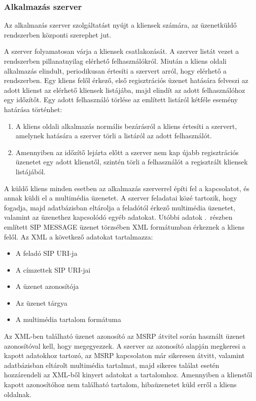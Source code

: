 \subsubsection{Alkalmazás szerver}
\label{sec:appserver}

Az alkalmazás szerver szolgáltatást nyújt a kliensek számára, az üzenetküldő rendszerben központi szerephet jut.

A szerver folyamatosan várja a kliensek csatlakozását. A szerver listát vezet a rendszerben pillanatnyilag elérhető felhasználókról. Miután a kliens oldali alkalmazás elindult, periodikusan értesíti a szervert arról, hogy elérhető a rendszerben. Egy kliens felől érkező, első regisztrációs üzenet hatására felveszi az adott klienst az elérhető kliensek listájába, majd elindít az adott felhasználóhoz egy időzítőt. Egy adott felhasználó törlése az említett listáról kétféle esemény határása történhet:
\begin{enumerate}\itemsep1pt
\item	A kliens oldali alkalmazás normális bezárásról a kliens értesíti a szervert, a\-mely\-nek hatására a szerver törli a listáról az adott felhasználót.
\item Amennyiben az időzítő lejárta előtt a szerver nem kap újabb regisztrációs üzenetet egy adott klienstől, szintén törli a felhasználót a regisztrált kliensek listájából.
\end{enumerate} 

A küldő kliens minden esetben az alkalmazás szerverrel építi fel a kapcsolatot, és annak küldi el a multimédia üzenetet. A szerver feladatai közé tartozik, hogy fogadja, majd adatbázisban eltárolja a feladótól érkező multimédia üzenetet, valamint az üzenethez kapcsolódó egyéb adatokat. Utóbbi adatok .~részben említett SIP MESSAGE üzenet törzsében XML formátumban érkeznek a kliens felől. Az XML a következő adatokat tartalmazza: 

\begin{itemize}\itemsep1pt
\item	A feladó SIP URI-ja
\item A címzettek SIP URI-jai
\item A üzenet azonosítója
\item Az üzenet tárgya
\item A multimédia tartalom formátuma
\end{itemize}

Az XML-ben található üzenet azonosító az MSRP átvitel során használt üzenet azonosítóval kell, hogy megegyezzek. A szerver az azonosító alapján megkeresi a kapott adatokhoz tartozó, az MSRP kapcsolaton már sikeresen átvitt, valamint adatbázisban eltárolt multimédia tartalmat, majd sikeres találat esetén hozzárendeli az XML-ből kinyert adatokat a tartalomhoz. Amennyiben a klienstől kapott azonosítóhoz nem található tartalom, hibaüzenetet küld erről a kliens oldalnak.

